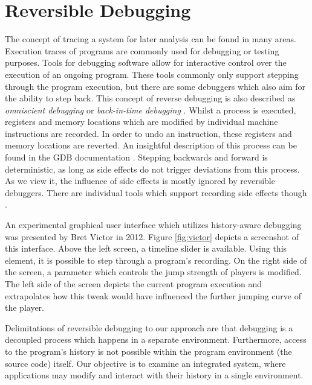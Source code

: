 \section{Reversible Debugging}
The concept of tracing a system for later analysis can be found in many areas.
Execution traces of programs are commonly used for debugging or testing purposes.
Tools for debugging software allow for interactive control over the execution of 
an ongoing program. These tools commonly only support stepping through the program 
execution, but there are some debuggers which also aim for the ability to step back. 
This concept of reverse debugging is also described as \emph{omniscient debugging}
\cite{Pothier2007} or \emph{back-in-time debugging} \cite{Lienhard2008}.  
%
Whilst a process is executed, registers and memory locations which are modified 
by individual machine instructions are recorded. In order to undo an instruction, 
these registers and memory locations are reverted. An insightful description of 
this process can be found in the GDB documentation \cite{GDB}.
Stepping backwards and forward is deterministic, as long as side effects do not 
trigger deviations from this process.
%
As we view it, the influence of side effects is mostly ignored by reversible 
debuggers. There are individual tools which support recording side effects 
though \cite{Sabin2010}.

An experimental graphical user interface which utilizes history-aware debugging 
was presented by Bret Victor \cite{Victor2012} in 2012. Figure \ref{fig:victor} 
depicts a screenshot of this interface. Above the left screen, a timeline slider 
is available. Using this element, it is possible to step through a program's 
recording. On the right side of the screen, a parameter which controls the jump 
strength of players is modified. The left side of the screen depicts the current 
program execution and extrapolates how this tweak would have influenced the 
further jumping curve of the player. 

Delimitations of reversible debugging to our approach are that debugging is a 
decoupled process which happens in a separate environment. Furthermore, access 
to the program's history is not possible within the program environment (the 
source code) itself. 
Our objective is to examine an integrated system, where applications may modify 
and interact with their history in a single environment.

